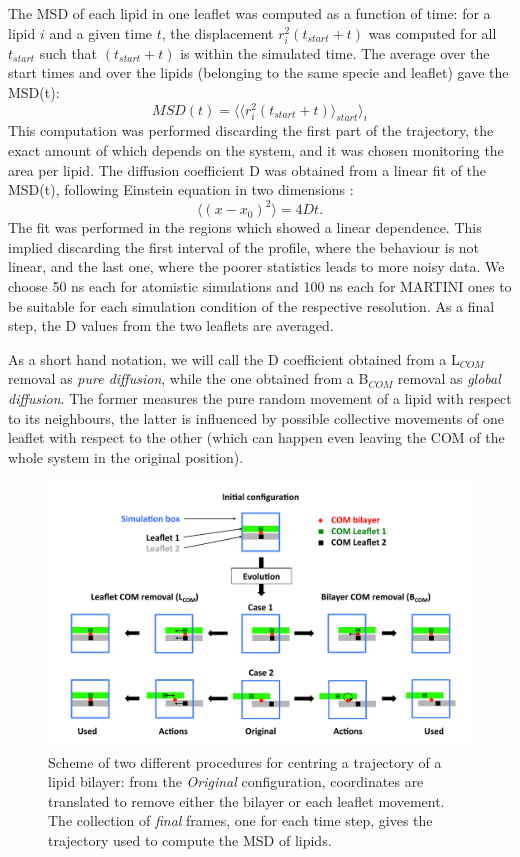 \begin{itemize}
The MSD of each lipid in one leaflet was computed as a function of time: for a lipid $i$ and a given time $t$, the displacement $r_i^2(t_{start}+t)$ was computed for all $t_{start}$ such that $(t_{start}+t)$ is within the simulated time. The average over the start times and over the lipids (belonging to the same specie and leaflet) gave the MSD(t):
\begin{equation}
MSD(t) = \langle \langle r_i^2(t_{start}+t) \rangle_{start} \rangle_i
\end{equation}
This computation was performed discarding the first part of the trajectory, the exact amount of which depends on the system, and it was chosen monitoring the area per lipid.
The diffusion coefficient D was obtained from a linear fit of the MSD(t), following Einstein equation in two dimensions \citep{Einstein1956}:
\begin{equation}
\langle \left( x - x_0 \right)^2 \rangle = 4Dt.
\end{equation}
The fit was performed in the regions which showed a linear dependence. This implied discarding the first interval of the profile, where the behaviour is not linear, and the last one, where the poorer statistics leads to more noisy data. We choose 50 ns each for atomistic simulations and 100 ns each for MARTINI ones to be suitable for each simulation condition of the respective resolution. As a final step, the D values from the two leaflets are averaged.

As a short hand notation, we will call the D coefficient obtained from a L$_{COM}$ removal as \emph{pure diffusion}, while the one obtained from a B$_{COM}$ removal as \emph{global diffusion}.
%
The former measures the pure random movement of a lipid with respect to its neighbours, the latter is influenced by possible collective movements of one leaflet with respect to the other (which can happen even leaving the COM of the whole system in the original position).
\begin{figure}[t!]
\centering
\includegraphics[width=0.75\linewidth]{3results_capsule/pics/diff_comrem} 
\caption[Preparation of trajectories for diffusion coefficient computation]{Scheme of two different procedures for centring a trajectory of a lipid bilayer: from the \emph{Original} configuration, coordinates are translated to remove either the bilayer or each leaflet movement. The collection of \emph{final} frames, one for each time step, gives the trajectory used to compute the MSD of lipids.}
\label{fig:com_rem_scheme}
\end{figure}
\end{itemize}

